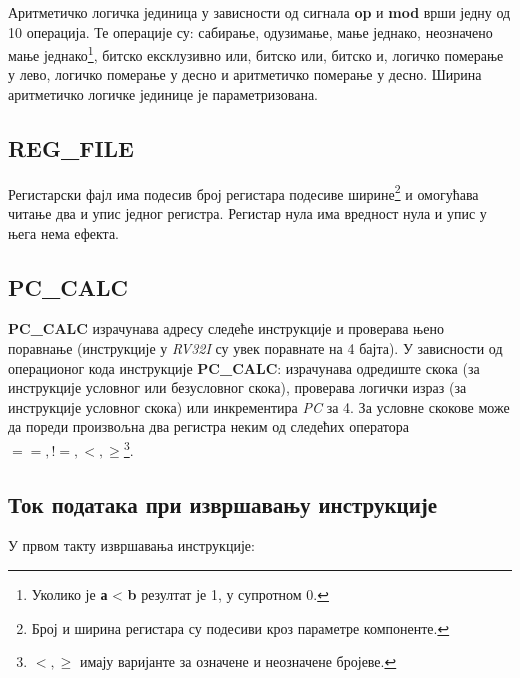Аритметичко логичка јединица у зависности од сигнала \textbf{op} и \textbf{mod} врши једну од 10 операција. Те операције су: сабирање, одузимање, мање једнако, неозначено мање једнако\footnote{Уколико је \textbf{а} < \textbf{b} резултат је 1, у супротном 0.}, битско ексклузивно или, битско или, битско и, логичко померање у лево, логичко померање у десно и аритметичко померање у десно. Ширина аритметичко логичке јединице је параметризована.

\subsection{\textbf{REG\_FILE}}

Регистарски фајл има подесив број регистара подесиве ширине\footnote{Број и ширина регистара су подесиви кроз параметре компоненте.} и омогућава читање два и упис једног регистра. Регистар нула има вредност нула и упис у њега нема ефекта.

\subsection{\textbf{PC\_CALC}}

\textbf{PC\_CALC} израчунава адресу следеће инструкције и проверава њено поравнање (инструкције у \textit{RV32I} су увек поравнате на 4 бајта).
У зависности од операционог кода инструкције \textbf{PC\_CALC}: израчунава одредиште скока (за инструкције условног или безусловног скока), проверава логички израз (за инструкције условног скока) или инкрементира \textit{\acrshort{PC}} за 4. За условне скокове  може да пореди произвољна два регистра неким од следећих оператора $==, !=, < , \ge $\footnote{$ < , \ge $ имају варијанте за означене и неозначене бројеве.}.

\newpage

\subsection{Ток података при извршавању инструкције}

У првом такту извршавања инструкције:

